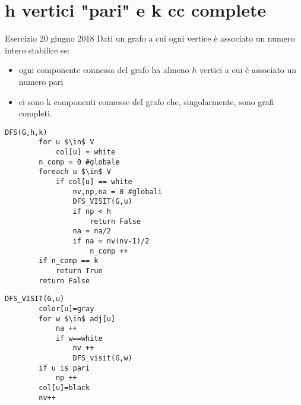 \documentclass[12pt, a4paper, openany]{book}
\begin{document}
\section{h vertici "pari" e k cc complete} Esercizio 20 giugno 2018
Dati un grafo a cui ogni vertice è associato un numero intero stabilire se:
\begin{itemize}
	\item ogni componente connessa del grafo ha almeno $h$ vertici a cui è associato un numero pari
	\item ci sono k componenti connesse del grafo che, singolarmente, sono grafi completi.
\end{itemize}
\begin{lstlisting}[style = small]
	DFS(G,h,k)
		for u $\in$ V
			col[u] = white
		n_comp = 0 #globale
		foreach u $\in$ V
			if col[u] == white
				nv,np,na = 0 #globali
				DFS_VISIT(G,u)
				if np < h
					return False
				na = na/2
				if na = nv(nv-1)/2
					n_comp ++
		if n_comp == k
			return True
		return False
\end{lstlisting}

\begin{lstlisting}[style = small]
	DFS_VISIT(G,u)
		color[u]=gray
		for w $\in$ adj[u]
			na ++
			if w==white
				nv ++
				DFS_visit(G,w)
		if u is pari
			np ++
		col[u]=black
		nv++
\end{lstlisting}
\end{document}
